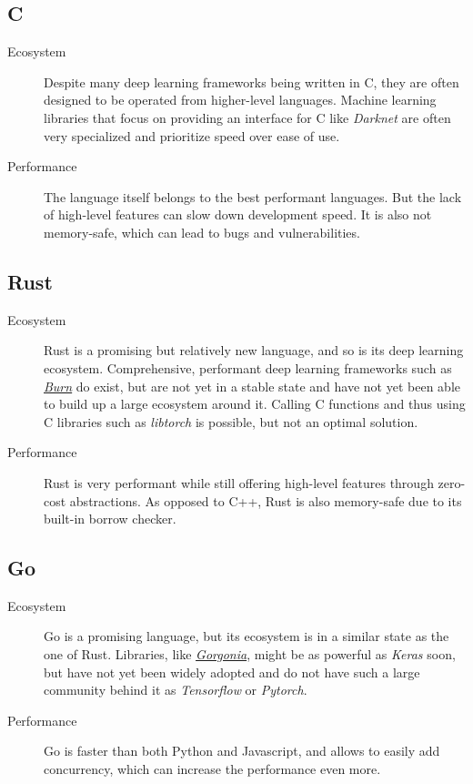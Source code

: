 \documentclass[12pt, a4paper, titlepage]{report}
\let\oldhref\href
\renewcommand{\href}[2]{\oldhref{#1}{\itshape#2}}
\begin{document}
{
   \center
   \subsection*{C}
}
\begin{description}
   \item[Ecosystem] Despite many deep learning frameworks being written in C, they are often designed to be operated from higher-level languages. Machine learning libraries that focus on providing an interface for C like \emph{Darknet} are often very specialized and prioritize speed over ease of use.
   \item[Performance] The language itself belongs to the best performant languages. But the lack of high-level features can slow down development speed. It is also not memory-safe, which can lead to bugs and vulnerabilities.
\end{description}

{
   \center
   \subsection*{Rust}
}
\begin{description}
   \item[Ecosystem] Rust is a promising but relatively new language, and so is its deep learning ecosystem. Comprehensive, performant deep learning frameworks such as \href{https://github.com/Tracel-AI/burn}{Burn} do exist, but are not yet in a stable state and have not yet been able to build up a large ecosystem around it. Calling C functions and thus using C libraries such as \emph{libtorch} is possible, but not an optimal solution.
   \item[Performance] Rust is very performant while still offering high-level features through zero-cost abstractions. As opposed to C++, Rust is also memory-safe due to its built-in borrow checker.
\end{description}

{
   \center
   \subsection*{Go}
}
\begin{description}
   \item[Ecosystem] Go is a promising language, but its ecosystem is in a similar state as the one of Rust. Libraries, like \href{https://github.com/Tracel-AI/gorgonia}{Gorgonia}, might be as powerful as \emph{Keras} soon, but have not yet been widely adopted and do not have such a large community behind it as \emph{Tensorflow} or \emph{Pytorch}.
   \item[Performance] Go is faster than both Python and Javascript, and allows to easily add concurrency, which can increase the performance even more.
\end{description}
\end{document}
